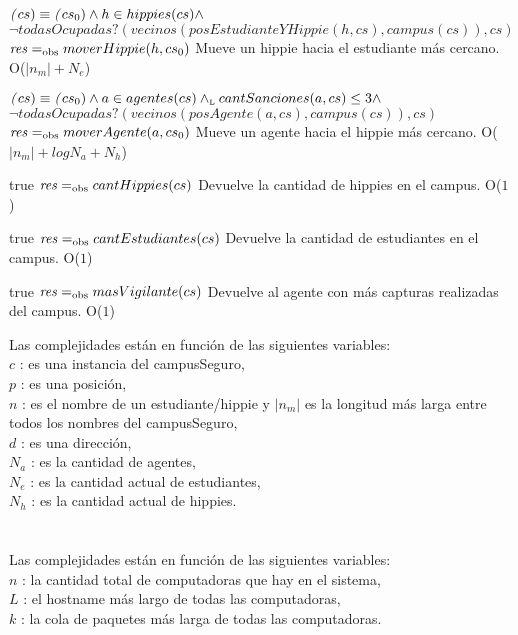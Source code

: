 {$\text{\textit{(}}cs) \equiv \text{\textit{(}}cs_0) \land h \in hippies(cs) \land $\\$ \neg todasOcupadas?(vecinos(posEstudianteYHippie(h, cs), campus(cs)), cs)$}
{$\text{\textit{res}} =_{\mathrm{obs}} moverHippie(h, cs_0)$}
{Mueve un hippie hacia el estudiante más cercano.}
{O($|n_m| + N_e$)}
{}


{$\text{\textit{(}}cs) \equiv \text{\textit{(}}cs_0) \land a \in agentes(cs) \land_{\mathrm{\scriptscriptstyle{L}}} cantSanciones(a, cs) \leq 3 \land $\\$ \neg todasOcupadas?(vecinos(posAgente(a, cs), campus(cs)), cs)$}
{$\text{\textit{res}} =_{\mathrm{obs}} moverAgente(a, cs_0)$}
{Mueve un agente hacia el hippie más cercano.}
{O($|n_m| + log N_a + N_h$)}
{}

 {true}
 {$\text{\textit{res}} =_{\mathrm{obs}} cantHippies(cs)$}
 {Devuelve la cantidad de hippies en el campus.}
 {O($1$)}
 {}
 
 {true}
 {$\text{\textit{res}} =_{\mathrm{obs}} cantEstudiantes(cs)$}
 {Devuelve la cantidad de estudiantes en el campus.}
 {O($1$)}
 {}
 
 {true}
 {$\text{\textit{res}} =_{\mathrm{obs}} masVigilante(cs)$}
 {Devuelve al agente con más capturas realizadas del campus.}
 {O($1$)}
 {}

Las complejidades están en función de las siguientes variables:\\
$c$ : es una instancia del campusSeguro, \\
$p$ : es una posición, \\
$n$ : es el nombre de un estudiante/hippie y $|n_m|$ es la longitud más larga entre todos los nombres del campusSeguro, \\
$d$ : es una dirección, \\
$N_a$ : es la cantidad de agentes, \\
$N_e$ : es la cantidad actual de estudiantes, \\
$N_h$ : es la cantidad actual de hippies. \\
\\ \\

 
Las complejidades están en función de las siguientes variables:\\
$n$ : la cantidad total de computadoras que hay en el sistema, \\
$L$ : el hostname más largo de todas las computadoras, \\
$k$ : la cola de paquetes más larga de todas las computadoras. 
\\ \\



